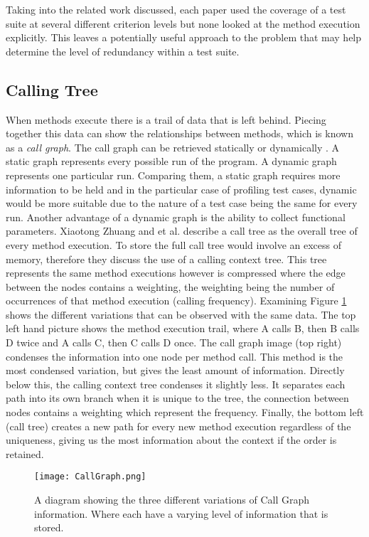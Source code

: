 Taking into the related work discussed, each paper used the coverage of a test suite at several different criterion levels but none looked at the method execution explicitly. This leaves a potentially useful approach to the problem that may help determine the level of redundancy within a test suite. 
\subsection{Calling Tree}
When methods execute there is a trail of data that is left behind. Piecing together this data can show the relationships between methods, which is known as a \textit{call graph}. The call graph can be retrieved statically or dynamically \cite{graham1982gprof}. A static graph represents every possible run of the program. A dynamic graph represents one particular run. Comparing them, a static graph requires more information to be held and in the particular case of profiling test cases, dynamic would be more suitable due to the nature of a test case being the same for every run. Another advantage of a dynamic graph is the ability to collect functional parameters. Xiaotong Zhuang and et al. \cite{Zhuang06accurate} describe a call tree as the overall tree of every method execution. To store the full call tree would involve an excess of memory, therefore they discuss the use of a calling context tree. This tree represents the same method executions however is compressed where the edge between the nodes contains a weighting, the weighting being the number of occurrences of that method execution (calling frequency). Examining Figure \ref{fig:callgraph} shows the different variations that can be observed with the same data. The top left hand picture shows the method execution trail, where A calls B, then B calls D twice and A calls C, then C calls D once. The call graph image (top right) condenses the information into one node per method call. This method is the most condensed variation, but gives the least amount of information. Directly below this, the calling context tree condenses it slightly less. It separates each path into its own branch when it is unique to the tree, the connection between nodes contains a weighting which represent the frequency. Finally, the bottom left (call tree) creates a new path for every new method execution regardless of the uniqueness, giving us the most information about the context if the order is retained.

\begin{figure}[h]
\begin{center}
\texttt{[image: CallGraph.png]}
\end{center}
\caption{A diagram showing the three different variations of Call Graph information. Where  each have a varying level of information that is stored.}
\label{fig:callgraph}
\end{figure}

